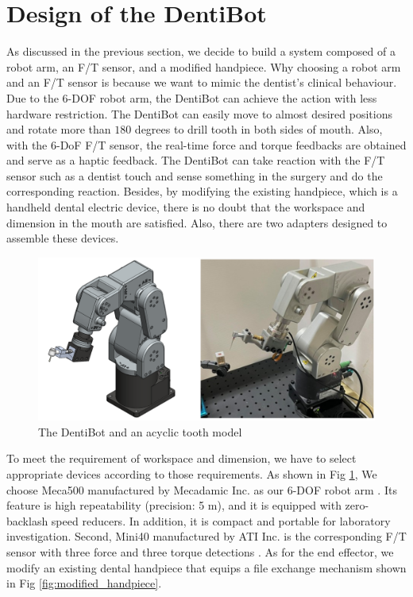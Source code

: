 \section{Design of the DentiBot}
\hspace*{6mm}As discussed in the previous section, we decide to build a system composed of a robot arm, an F/T sensor, and a modified handpiece. Why choosing a robot arm and an F/T sensor is because we want to mimic the dentist's clinical behaviour. Due to the 6-DOF robot arm, the DentiBot can achieve the action with less hardware restriction. The DentiBot can easily move to almost desired positions and rotate more than $180$ degrees to drill tooth in both sides of mouth. Also, with the 6-DoF F/T sensor, the real-time force and torque feedbacks are obtained and serve as a haptic feedback. The DentiBot can take reaction with the F/T sensor such as a dentist touch and sense something in the surgery and do the corresponding reaction. Besides, by modifying the existing handpiece, which is a handheld dental electric device, there is no doubt that the workspace and dimension in the mouth are satisfied. Also, there are two adapters designed to assemble these devices.
\par
\begin{figure}[htbp]
\begin{center}
\includegraphics[width=1\linewidth]{Images/DentiBot.png}
\caption{
The DentiBot and an acyclic tooth model
}\label{fig:DentiBot}
\end{center}
\end{figure}	
To meet the requirement of workspace and dimension, we have to select appropriate devices according to those requirements. As shown in Fig \ref{fig:DentiBot}, We choose Meca500 manufactured by Mecadamic Inc. as our 6-DOF robot arm  \cite{web4} . Its feature is high repeatability (precision: 5 \textmu m), and it is equipped with zero-backlash speed reducers. In addition, it is compact and portable for laboratory investigation. Second, Mini40 manufactured by ATI Inc. is the corresponding F/T sensor with three force and three torque detections \cite{web5}. As for the end effector, we modify an existing dental handpiece that equips a file exchange mechanism shown in Fig \ref{fig:modified_handpiece}.

